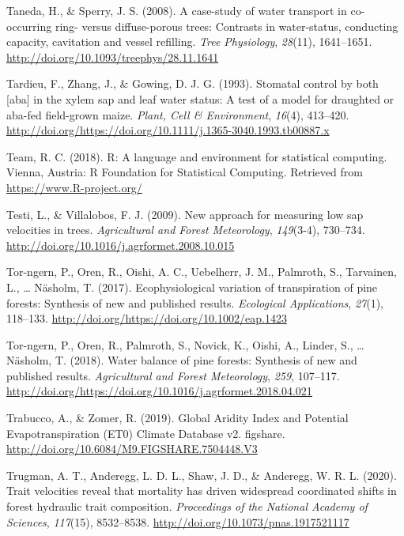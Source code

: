 \documentclass[11pt,twoside]{reedthesis}
\begin{document}
\hypertarget{ref-Taneda2008}{}
Taneda, H., \& Sperry, J. S. (2008). A case-study of water transport in
co-occurring ring- versus diffuse-porous trees: Contrasts in
water-status, conducting capacity, cavitation and vessel refilling.
\emph{Tree Physiology}, \emph{28}(11), 1641--1651.
\url{http://doi.org/10.1093/treephys/28.11.1641}

\hypertarget{ref-Tardieu1993}{}
Tardieu, F., Zhang, J., \& Gowing, D. J. G. (1993). Stomatal control by
both {[}aba{]} in the xylem sap and leaf water status: A test of a model
for draughted or aba-fed field-grown maize. \emph{Plant, Cell \&
Environment}, \emph{16}(4), 413--420.
\url{http://doi.org/https://doi.org/10.1111/j.1365-3040.1993.tb00887.x}

\hypertarget{ref-r_core_team_r_2018}{}
Team, R. C. (2018). R: A language and environment for statistical
computing. Vienna, Austria: R Foundation for Statistical Computing.
Retrieved from \url{https://www.R-project.org/}

\hypertarget{ref-Testi2009}{}
Testi, L., \& Villalobos, F. J. (2009). New approach for measuring low
sap velocities in trees. \emph{Agricultural and Forest Meteorology},
\emph{149}(3-4), 730--734.
\url{http://doi.org/10.1016/j.agrformet.2008.10.015}

\hypertarget{ref-Tor-ngern2017}{}
Tor-ngern, P., Oren, R., Oishi, A. C., Uebelherr, J. M., Palmroth, S.,
Tarvainen, L., \ldots{} Näsholm, T. (2017). Ecophysiological variation
of transpiration of pine forests: Synthesis of new and published
results. \emph{Ecological Applications}, \emph{27}(1), 118--133.
\url{http://doi.org/https://doi.org/10.1002/eap.1423}

\hypertarget{ref-Torngern2018}{}
Tor-ngern, P., Oren, R., Palmroth, S., Novick, K., Oishi, A., Linder,
S., \ldots{} Näsholm, T. (2018). Water balance of pine forests:
Synthesis of new and published results. \emph{Agricultural and Forest
Meteorology}, \emph{259}, 107--117.
\url{http://doi.org/https://doi.org/10.1016/j.agrformet.2018.04.021}

\hypertarget{ref-trabucco_global_2019}{}
Trabucco, A., \& Zomer, R. (2019). Global Aridity Index and Potential
Evapotranspiration (ET0) Climate Database v2. figshare.
\url{http://doi.org/10.6084/M9.FIGSHARE.7504448.V3}

\hypertarget{ref-trugman_trait_2020}{}
Trugman, A. T., Anderegg, L. D. L., Shaw, J. D., \& Anderegg, W. R. L.
(2020). Trait velocities reveal that mortality has driven widespread
coordinated shifts in forest hydraulic trait composition.
\emph{Proceedings of the National Academy of Sciences}, \emph{117}(15),
8532--8538. \url{http://doi.org/10.1073/pnas.1917521117}
\end{document}
